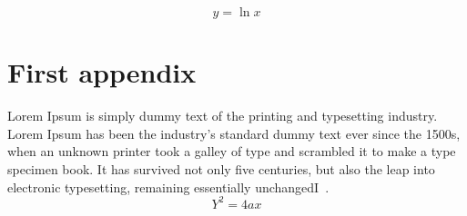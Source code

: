 \documentclass[10pt, a4paper]{article}
\begin{document}
\begin{equation}
y = \ln x
\end{equation}

\appendix
\section{First appendix}
Lorem Ipsum is simply dummy text of the printing and typesetting industry. Lorem Ipsum has been the industry's standard dummy text ever since the 1500s, when an unknown printer took a galley of type and scrambled it to make a type specimen book. It has survived not only five centuries, but also the leap into electronic typesetting, remaining essentially unchangedI~\citep{Davies1998}.
\begin{equation}
Y^2 = 4ax
\end{equation}



\end{document}
